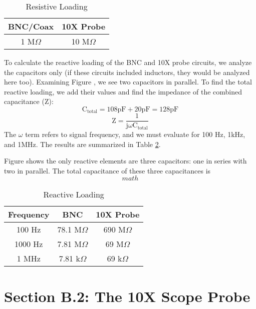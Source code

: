 \documentclass[12pt,letterpaper]{report}
\begin{document}
\begin{center}
\begin{table}[ht]
\caption{Resistive Loading} %
\centering 
	\begin{tabular}{| c | c |}
	\hline
	
	BNC/Coax & 10X Probe \\
	\hline
	1 M$\Omega $ & 10 M$\Omega$ \\

	\hline
	\end{tabular}
	\label{table:ResistiveLoading}
\end{table}
\end{center}

To calculate the reactive loading of the BNC and 10X probe circuits, we analyze the capacitors only (if these circuits included inductors, they would be analyzed here too). Examining Figure 
, we see two capacitors in parallel. To find the total reactive loading, we add their values and find the impedance of the combined capacitance (Z):
$$ \text{C}_{\text{total}} = 108 \text{pF} + 20 \text{pF} = 128 \text{pF} $$
$$ \text{Z} = \frac{1}{\text{j}\omega\text{C}_{\text{total}}} $$
The $\omega$ term refers to signal frequency, and we must evaluate for 100 Hz, 1kHz, and 1MHz. The results are summarized in Table \ref{table:ReactiveLoading}.

Figure 
 shows the only reactive elements are three capacitors: one in series with two in parallel. 
The total capacitance of these three capacitances is
$$ math $$

 
\begin{center}
\begin{table}[ht]
\caption{Reactive Loading}
\centering
	\begin{tabular}{| c | c | c |}
	\hline	
	Frequency & BNC & 10X Probe \\
	\hline
	100 Hz & 78.1 M$\Omega$ & 690 M$\Omega$\\
	1000 Hz & 7.81 M$\Omega$ & 69 M$\Omega$\\
	1 MHz & 7.81 k$\Omega$ & 69 k$\Omega$\\	
	\hline
	\end{tabular}
	\label{table:ReactiveLoading}
\end{table}
\end{center}

\section*{Section B.2: The 10X Scope Probe}
\end{document}
